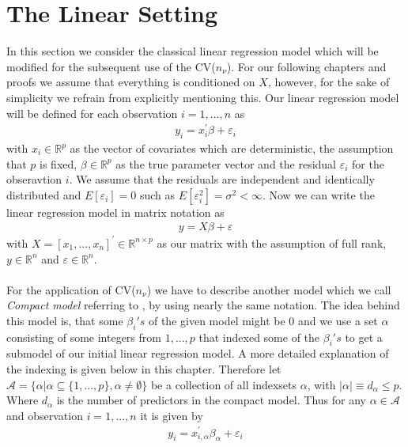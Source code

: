 \documentclass[Research_Module_ES.tex]{subfiles}
\begin{document}
\section{The Linear Setting}
In this section we consider the classical linear regression model which will be modified for the subsequent use of the CV($n_\nu$). For our following chapters and proofs we assume that everything is conditioned on $X$, however, for the sake of simplicity we refrain from explicitly mentioning this. Our linear regression model will be defined for each observation $i=1,...,n$ as
\begin{align*}
y_i=x_i^\prime\beta+\varepsilon_i
\end{align*}
with $x_i\in\mathbb{R}^p$ as the vector of covariates which are deterministic, the assumption that $p$ is fixed, $\beta\in\mathbb{R}^p$ as the true parameter vector and the residual $\varepsilon_i$ for the obseravtion $i$.
We assume that the residuals are independent and identically distributed and $E[\varepsilon_i]=0$ such as $E[\varepsilon_i^2]=\sigma^2<\infty$. Now we can write the linear regression model in matrix notation as
\begin{align*}
	y=X\beta+\varepsilon
\end{align*}
with $X=[x_1,...,x_n]^\prime\in\mathbb{R}^{n\times p}$ as our matrix with the assumption of full rank, $y\in\mathbb{R}^{n}$ and $\varepsilon\in\mathbb{R}^{n}$.
\\\\
For the application of CV($n_\nu$) we have to describe another model which we call \textit{Compact model} referring to \cite{shao}, by using nearly the same notation. The idea behind this model is, that some $\beta_i's$ of the given model might be $0$ and we use a set $\alpha$ consisting of some integers from $1,...,p$ that indexed some of the $\beta_i's$ to get a submodel of our initial linear regression model. A more detailed explanation of the indexing is given below in this chapter. Therefore let 
$\mathcal{A}=\{\alpha|\alpha\subseteq\{1,...,p\},\alpha\neq\emptyset\}$ be a collection of all indexsets $\alpha$, with 
$|\alpha|\equiv d_\alpha\leq p$. Where $d_\alpha$ is the number of predictors in the compact model. Thus for any $\alpha\in\mathcal{A}$ and observation $i=1,...,n$ it is given by
\begin{align*}
	y_i=x_{i,\alpha}^\prime\beta_\alpha+\varepsilon_i
\end{align*}
\end{document}
